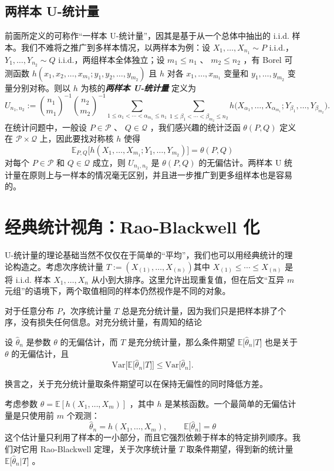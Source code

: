 \subsection{两样本 U-统计量}

前面所定义的可称作``一样本 U-统计量''，因其是基于从一个总体中抽出的 i.i.d. 样本。我们不难将之推广到多样本情况，以两样本为例：设 $X_1,\dots,X_{n_1}\sim P$ i.i.d.， $Y_1,\dots,Y_{n_2}\sim Q$ i.i.d.，两组样本全体独立；设 $m_1\le n_1$ 、 $m_2\le n_2$ ，有 Borel 可测函数 $h(x_1,x_2,\dots,x_{m_1};y_1,y_2,\dots,y_{m_2})$ 且 $h$ 对各 $x_1,\dots,x_{m_1}$ 变量和 $y_1,\dots,y_{m_2}$ 变量分别对称。则以 $h$ 为核的\textbf{\emph{两样本 U-统计量}} 定义为\[U_{n_1,n_2}:={\binom {n_1}{m_1}}^{-1}{\binom{n_2}{m_2} }^{-1}\sum_{1\le \alpha_1<\cdots<\alpha_{m_1}\le n_1}\sum_{1\le \beta_1<\cdots<\beta_{m_2}\le n_2}h\big(X_{\alpha_1},\dots,X_{\alpha_{m_1}};Y_{\beta_1},\dots,Y_{\beta_{m_2}}\big).\]在统计问题中，一般设 $P\in\mathscr P$ 、 $Q\in\mathscr Q$ ，我们感兴趣的统计泛函 $\theta(P,Q)$ 定义在 $\mathscr P\times \mathscr Q$ 上，因此要找对称核 $h$ 使得\[\mathbb E_{P,Q}\Big[h(X_1,\dots,X_{m_1};Y_1,\dots,Y_{m_2})\Big]=\theta(P,Q)\]对每个 $P\in\mathscr P$ 和 $Q\in\mathscr Q$ 成立，则 $U_{n_1,n_2}$ 是 $\theta(P,Q)$ 的无偏估计。两样本 U 统计量在原则上与一样本的情况毫无区别，并且进一步推广到更多组样本也是容易的。

\section{经典统计视角：Rao‑Blackwell 化}

U-统计量的理论基础当然不仅仅在于简单的``平均''，我们也可以用经典统计的理论构造之。考虑次序统计量 $T:=(X_{(1)},\dots,X_{(n)})$其中 $X_{(1)}\le \cdots\le X_{(n)}$ 是将 i.i.d. 样本 $X_1,\dots,X_n$ 从小到大排序。这里允许出现重复值，但在后文``互异 $m$ 元组''的语境下，两个取值相同的样本仍然视作是不同的对象。

对于任意分布 $P$，次序统计量 $T$ 总是充分统计量，因为我们只是把样本排了个序，没有损失任何信息。对充分统计量，有周知的结论

\begin{theorem} 设 $\widehat\theta_n$ 是参数 $\theta$ 的无偏估计，而 $T$ 是充分统计量，那么条件期望 $\mathbb E\big[\widehat\theta_n|T\big]$ 也是关于 $\theta$ 的无偏估计，且
\[
\mathrm{Var}\big[\mathbb E\big[\widehat\theta_n|T\big]\big]\le \mathrm{Var}\big[\widehat\theta_n\big].
\]

换言之，关于充分统计量取条件期望可以在保持无偏性的同时降低方差。
\end{theorem}
考虑参数 $\theta = \mathbb{E}[h(X_1,\ldots,X_m)]$ ，其中 $h$ 是某核函数。一个最简单的无偏估计量是只使用前 $m$ 个观测：
\[\widehat\theta_n = h(X_1,\ldots,X_m),\qquad \mathbb{E}\big[\widehat\theta_n\big] = \theta\]
这个估计量只利用了样本的一小部分，而且它强烈依赖于样本的特定排列顺序。我们对它用 Rao‑Blackwell 定理，关于次序统计量 $T$ 取条件期望，得到新的统计量 $\mathbb E\big[\widehat\theta_n|T\big]$ 。

